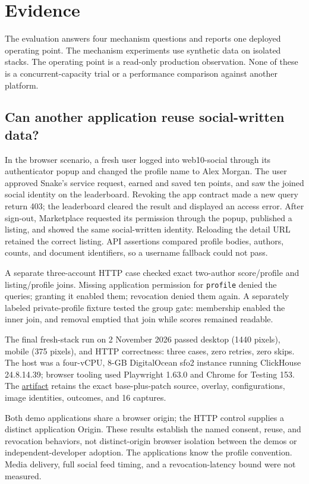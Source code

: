 \documentclass[sigconf, nonacm]{acmart}
\newcommand{\artifactbase}{https://github.com/jacoby149/web10}
\newcommand{\domainartifactrev}{26720acba859c7eb03fc5d26a6221cdde5b764a1}
\newcommand{\evidence}[2]{\href{\artifactbase/tree/\domainartifactrev/#1}{#2}}
\begin{document}
\section{Evidence}
\label{sec:evaluation}

The evaluation answers four mechanism questions and reports one deployed
operating point. The mechanism experiments use synthetic data on isolated
stacks. The operating point is a read-only production observation. None
of these is a concurrent-capacity trial or a performance comparison
against another platform.

\subsection{Can another application reuse social-written data?}
\label{sec:ev-interop}

In the browser scenario, a fresh user logged into web10-social through
its authenticator popup and changed the profile name to Alex Morgan.
The user approved Snake's service request, earned and saved ten points,
and saw the joined social identity on the leaderboard. Revoking the app
contract made a new query return 403; the leaderboard cleared the result
and displayed an access error. After sign-out, Marketplace requested
its permission through the popup, published a listing, and showed the
same social-written identity. Reloading the detail URL retained the
correct listing. API assertions compared profile bodies, authors, counts,
and document identifiers, so a username fallback could not pass.

A separate three-account HTTP case checked exact two-author score/profile
and listing/profile joins. Missing application permission for
\texttt{profile} denied the queries; granting it enabled them; revocation
denied them again. A separately labeled private-profile fixture tested
the group gate: membership enabled the inner join, and removal emptied
that join while scores remained readable.

The final fresh-stack run on 2 November 2026 passed desktop (1440 pixels),
mobile (375 pixels), and HTTP correctness: three cases, zero retries,
zero skips. The host was a four-vCPU, 8-GB DigitalOcean sfo2 instance
running ClickHouse 24.8.14.39; browser tooling used Playwright 1.63.0 and
Chrome for Testing 153. The \evidence{research/interoperability-demo}{artifact}
retains the exact base-plus-patch source, overlay, configurations, image
identities, outcomes, and 16 captures.

Both demo applications share a browser origin; the HTTP control supplies
a distinct application Origin. These results establish the named
consent, reuse, and revocation behaviors, not distinct-origin browser
isolation between the demos or independent-developer adoption. The
applications know the profile convention. Media delivery, full social
feed timing, and a revocation-latency bound were not measured.
\end{document}
